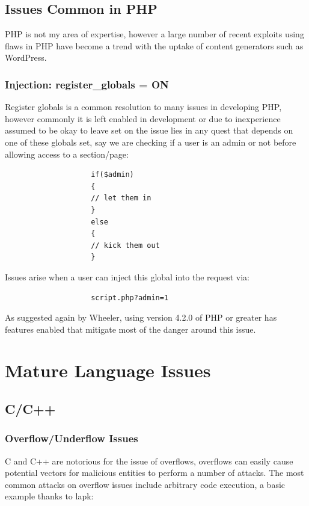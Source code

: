 \documentclass{IEEEtran}
\begin{document}
        \subsection{Issues Common in PHP}
            PHP is not my area of expertise, however a large number of recent exploits using 
            flaws in PHP have become a trend with the uptake of content generators such as WordPress.
            \subsubsection{Injection: register\_globals = ON}
                Register globals is a common resolution to many issues in developing PHP, however
                commonly it is left enabled in development or due to inexperience assumed to be okay to 
                leave set on the issue lies in any quest that depends on one of these globals set, say we are 
                checking if a user is an admin or not before allowing access to a section/page:

                \lstset{style=php}
                \begin{lstlisting}
                    if($admin) 
                    { 
                    // let them in 
                    } 
                    else 
                    { 
                    // kick them out 
                    }
                \end{lstlisting}\cite{Devshed-PHP}

                Issues arise when a user can inject this global into the request via:

                \begin{lstlisting}
                    script.php?admin=1
                \end{lstlisting}

                As suggested again by Wheeler\cite{Wheeler}, using version 4.2.0 of PHP or greater has 
                features enabled that mitigate most of the danger around this issue.

    \section{Mature Language Issues}
        \subsection{C/C++}
            \subsubsection{Overflow/Underflow Issues}
                C and C++ are notorious for the issue of overflows, overflows can easily 
                cause potential vectors for malicious entities to perform a number of 
                attacks.
                The most common attacks on overflow issues include arbitrary code execution,
                a basic example thanks to lapk\cite{lapk}:
\end{document}
